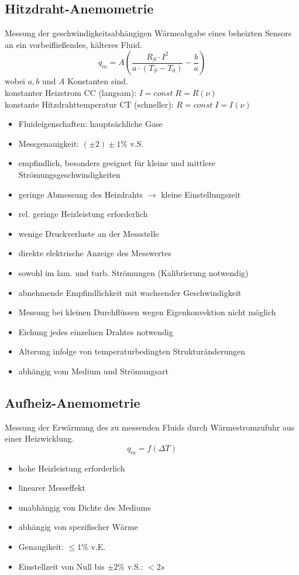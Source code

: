 \documentclass{scrreprt}
\begin{document}
\subsection{Hitzdraht-Anemometrie}
Messung der geschwindigkeitsabhängigen Wärmeabgabe eines beheizten Sensors an ein vorbeifließendes, kälteres Fluid.
$$q_m = A \left( \frac{R_S \cdot I^2}{a\cdot (T_S-T_0)}-\frac{b}{a}\right)$$
wobei $a,b$ und $A$ Konstanten sind.\\
konstanter Heizstrom CC (langsam): $I=const \; R=R(\nu)$\\
konstante Hitzdrahttemperatur CT (schneller): $R=const \; I=I(\nu)$
\begin{itemize}
\item Fluideigenschaften: hauptsächliche Gase
\item Messgenauigkeit: $(\pm 2) \pm 1 \%$ v.S.
\end{itemize}
\begin{itemize}[label=$+$]
\item empfindlich, besonders geeignet für kleine und mittlere Strömungsgeschwindigkeiten
\item geringe Abmessung des Heizdrahts $\rightarrow$ kleine Einstellungszeit
\item rel. geringe Heizleistung erforderlich
\item wenige Druckverluste an der Messstelle
\item direkte elektrische Anzeige des Messwertes
\item sowohl im lam. und turb. Strömungen (Kalibrierung notwendig)
\end{itemize}
\begin{itemize}[label=$-$]
\item abnehmende Empfindlichkeit mit wachsender Geschwindigkeit
\item Messung bei kleinen Durchflüssen wegen Eigenkonvektion nicht möglich
\item Eichung jedes einzelnen Drahtes notwendig
\item Alterung infolge von temperaturbedingten Strukturänderungen
\item abhängig vom Medium und Strömungsart
\end{itemize}
\subsection{Aufheiz-Anemometrie}
Messung der Erwärmung des zu messenden Fluids durch Wärmestromzufuhr aus einer Heizwicklung.
$$q_m=f(\Delta T)$$
\begin{itemize}
\item hohe Heizleistung erforderlich
\item linearer Messeffekt
\item unabhängig von Dichte des Mediums
\item abhängig von spezifischer Wärme
\item Genaugikeit: $\leq 1 \%$ v.E.
\item Einstellzeit von Null bis $\pm 2 \%$ v.S.: $< 2\unit{s}$
\end{itemize}
\end{document}
